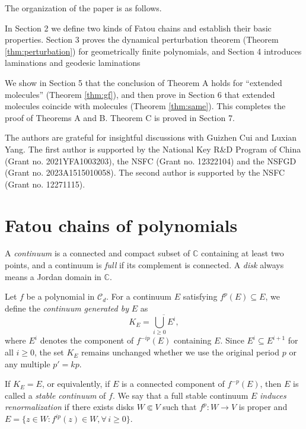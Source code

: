 \documentclass[a4paper,reqno,times, 11pt]{amsart}
\theoremstyle{remark}
\theoremstyle{plain}
\numberwithin{equation}{section}
\def\CCCC{\mathscr C}
\def\C{\mbox{$\mathbb C$}}
\def\ov{\overline}
\begin{document}
	
	
	The organization of the paper is as follows.\vspace{2pt}
	
	In Section 2 we define two kinds of Fatou chains and establish their basic properties.  Section 3 proves the dynamical perturbation theorem (Theorem  \ref{thm:perturbation}) for geometrically finite polynomials, and Section 4 introduces laminations and geodesic laminations	
	
	We show in Section 5 that the conclusion of Theorem A holds for ``extended molecules'' (Theorem \ref{thm:gf}), and then prove in Section 6 that extended molecules coincide with molecules (Theorem \ref{thm:same}). This completes the proof of Theorems A and B.
	Theorem C is proved in Section 7.
	
	
	
	\vspace{15pt}
	
	 The authors are grateful for insightful discussions with Guizhen Cui and Luxian Yang. The first author is supported by the  National Key R\&D Program of China (Grant no. 2021YFA1003203), the NSFC (Grant no. 12322104)
	and the NSFGD (Grant no. 2023A1515010058). The second author is supported by the NSFC (Grant
	no. 12271115).
	
	\section{Fatou chains of polynomials}\label{sec:chain}
	
	
	
	A \emph{continuum} is a connected and compact subset of $\mathbb{C}$ containing at least two points, and a continuum is \emph{full} if its complement is connected. A \emph{disk} always means a Jordan domain in $\C$.	
	
	Let $f$ be a polynomial in $\CCCC_d$. For a continuum $E$ satisfying $f^p(E)\subseteq E$, we define the \emph{continuum generated by} $E$ as
	\[K_E=\ov{\bigcup_{i\geq 0} E^i},\] where $E^i$ denotes the component of $f^{-ip}(E)$ containing $E$. Since $E^i\subseteq E^{i+1}$ for all $i\ge0$, the set $K_E$ remains unchanged whether we use the original period $p$ or any multiple $p'=kp$.
	
	If $K_E=E$, or equivalently, if $E$ is a connected component of $f^{-p}(E)$, then $E$ is called a \emph{stable continuum} of $f$.
	We say that a full stable continuum $E$ \emph{induces  renormalization} if there exists disks $W\Subset V$ such that $f^p:W\to V$ is proper and $E=\{z\in W: f^{ip}(z)\in W,\forall\, i\geq0\}$.
	
\end{document}
